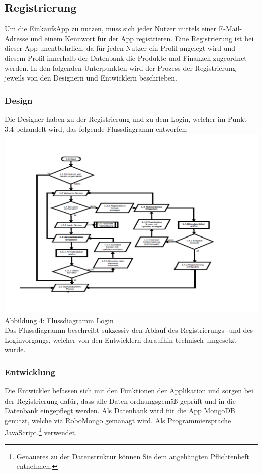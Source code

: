 \documentclass[12pt,a4paper]{article}
\begin{document}
\subsection{Registrierung}
Um die EinkaufsApp zu nutzen, muss sich jeder Nutzer mittels einer E-Mail-Adresse und einem Kennwort für der App registrieren.
Eine Registrierung ist bei dieser App unentbehrlich, da für jeden Nutzer ein Profil angelegt wird und diesem Profil innerhalb der Datenbank die Produkte und Finanzen zugeordnet werden.
In den folgenden Unterpunkten wird der Prozess der Registrierung jeweils von den Designern und Entwicklern beschrieben.
\subsubsection*{Design}
Die Designer haben zu der Registrierung und zu dem Login, welcher im Punkt 3.4 behandelt wird, das folgende Flussdiagramm entworfen:
\\
\hspace*{-10mm} \includegraphics[trim = 17mm 0mm 0mm 20mm, clip, scale=0.8]{Login-PDF.pdf}
\footnotesize Abbildung 4: Flussdiagramm Login
\normalsize
\\
\linebreak
Das Flussdiagramm beschreibt sukzessiv den Ablauf des Registrierungs- und des Loginvorgangs, welcher von den Entwicklern daraufhin technisch umgesetzt wurde.
\newpage
\subsubsection*{Entwicklung}
Die Entwickler befassen sich mit den Funktionen der Applikation  und sorgen bei der Registrierung dafür, dass alle Daten ordnungsgemäß geprüft und in die Datenbank eingepflegt werden.
Als Datenbank wird für die App MongoDB genutzt, welche via RoboMongo gemanagt wird. Als Programmiersprache JavaScript.\footnote{Genaueres zu der Datenstruktur können Sie dem angehängten Pflichtenheft entnehmen.} verwendet.
\end{document}
